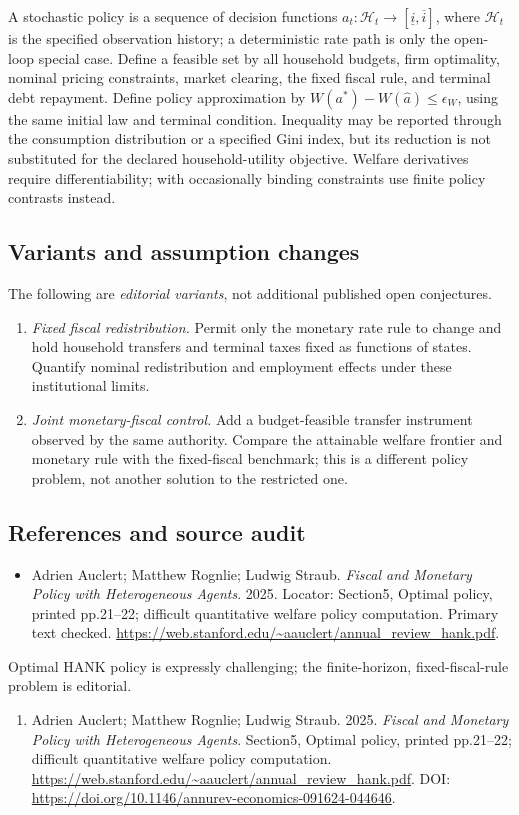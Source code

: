 \documentclass[11pt,a4paper]{article}
\begin{document}
A stochastic policy is a sequence of decision functions \(a_t:\mathcal H_t\to[\underline i,\overline i]\), where \(\mathcal H_t\) is the specified observation history; a deterministic rate path is only the open-loop special case. Define a feasible set by all household budgets, firm optimality, nominal pricing constraints, market clearing, the fixed fiscal rule, and terminal debt repayment. Define policy approximation by \(W(a^*)-W(\widehat a)\le\epsilon_W\), using the same initial law and terminal condition. Inequality may be reported through the consumption distribution or a specified Gini index, but its reduction is not substituted for the declared household-utility objective. Welfare derivatives require differentiability; with occasionally binding constraints use finite policy contrasts instead.
\subsection*{Variants and assumption changes}
The following are \emph{editorial variants}, not additional published open conjectures.
\begin{enumerate}
\item \emph{Fixed fiscal redistribution.} Permit only the monetary rate rule to change and hold household transfers and terminal taxes fixed as functions of states. Quantify nominal redistribution and employment effects under these institutional limits.
\item \emph{Joint monetary-fiscal control.} Add a budget-feasible transfer instrument observed by the same authority. Compare the attainable welfare frontier and monetary rule with the fixed-fiscal benchmark; this is a different policy problem, not another solution to the restricted one.
\end{enumerate}
\subsection*{References and source audit}
\begin{itemize}
\item Adrien Auclert; Matthew Rognlie; Ludwig Straub. \emph{Fiscal and Monetary Policy with Heterogeneous Agents}. 2025. Locator: Section5, Optimal policy, printed pp.21--22; difficult quantitative welfare policy computation. Primary text checked. \url{https://web.stanford.edu/~aauclert/annual_review_hank.pdf}.
\end{itemize}
Optimal HANK policy is expressly challenging; the finite-horizon, fixed-fiscal-rule problem is editorial.
\begin{enumerate}\raggedright
\item\hypertarget{definitions:source:30007530:1}{} Adrien Auclert; Matthew Rognlie; Ludwig Straub. 2025. \emph{Fiscal and Monetary Policy with Heterogeneous Agents}. Section5, Optimal policy, printed pp.21--22; difficult quantitative welfare policy computation.
\url{https://web.stanford.edu/~aauclert/annual_review_hank.pdf}.
DOI: \url{https://doi.org/10.1146/annurev-economics-091624-044646}.
\end{enumerate}
\end{document}

